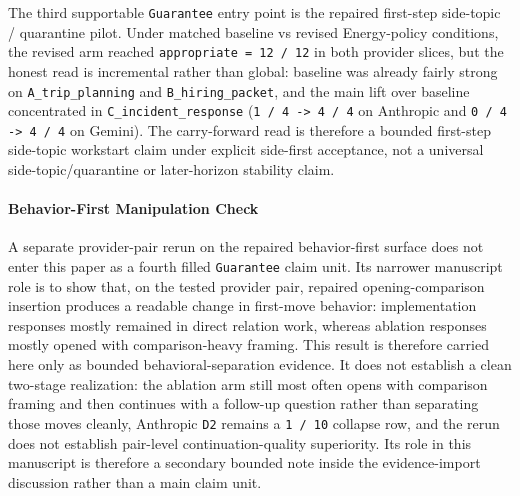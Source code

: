 \documentclass[11pt]{article}
\begin{document}
The third supportable \texttt{Guarantee} entry point is the repaired first-step
side-topic / quarantine pilot. Under matched baseline vs revised Energy-policy
conditions, the revised arm reached \texttt{appropriate = 12 / 12} in both
provider slices, but the honest read is incremental rather than global:
baseline was already fairly strong on \texttt{A\_trip\_planning} and
\texttt{B\_hiring\_packet}, and the main lift over baseline concentrated in
\texttt{C\_incident\_response} (\texttt{1 / 4 -> 4 / 4} on Anthropic and
\texttt{0 / 4 -> 4 / 4} on Gemini). The carry-forward read is therefore a
bounded first-step side-topic workstart claim under explicit side-first
acceptance, not a universal side-topic/quarantine or later-horizon stability
claim.

\paragraph{Behavior-First Manipulation Check}

A separate provider-pair rerun on the repaired behavior-first surface does not
enter this paper as a fourth filled \texttt{Guarantee} claim unit. Its narrower
manuscript role is to show that, on the tested provider pair, repaired
opening-comparison insertion produces a readable change in first-move behavior:
implementation responses mostly remained in direct relation work, whereas
ablation responses mostly opened with comparison-heavy framing. This result is
therefore carried here only as bounded behavioral-separation evidence. It does
not establish a clean two-stage realization: the ablation arm still most often
opens with comparison framing and then continues with a follow-up question
rather than separating those moves cleanly, Anthropic \texttt{D2} remains a
\texttt{1 / 10} collapse row, and the rerun does not establish pair-level
continuation-quality superiority. Its role in this manuscript is therefore a
secondary bounded note inside the evidence-import discussion rather than a main
claim unit.
\end{document}
